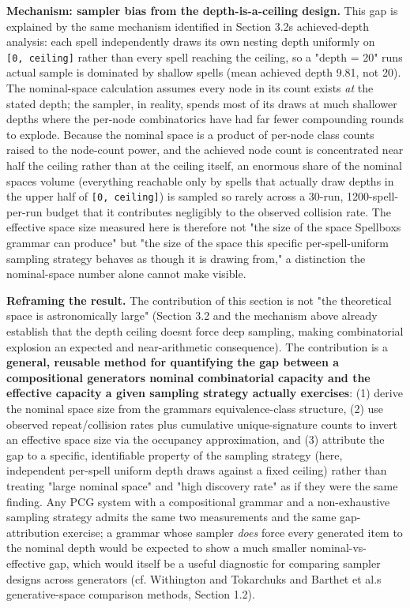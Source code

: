 \documentclass[
  10pt,
  twocolumn]{article}
\begin{document}
\textbf{Mechanism: sampler bias from the depth-is-a-ceiling design.}
This gap is explained by the same mechanism identified in Section
3.2\textquotesingle s achieved-depth analysis: each spell independently
draws its own nesting depth uniformly on \texttt{{[}0,\ ceiling{]}}
rather than every spell reaching the ceiling, so a "depth = 20"
run\textquotesingle s actual sample is dominated by shallow spells (mean
achieved depth 9.81, not 20). The nominal-space calculation assumes
every node in its count exists \emph{at} the stated depth; the sampler,
in reality, spends most of its draws at much shallower depths where the
per-node combinatorics have had far fewer compounding rounds to explode.
Because the nominal space is a product of per-node class counts raised
to the node-count power, and the achieved node count is concentrated
near half the ceiling rather than at the ceiling itself, an enormous
share of the nominal space\textquotesingle s volume (everything
reachable only by spells that actually draw depths in the upper half of
\texttt{{[}0,\ ceiling{]}}) is sampled so rarely across a 30-run,
1200-spell-per-run budget that it contributes negligibly to the observed
collision rate. The effective space size measured here is therefore not
"the size of the space Spellbox\textquotesingle s grammar can produce"
but "the size of the space this specific per-spell-uniform sampling
strategy behaves as though it is drawing from," a distinction the
nominal-space number alone cannot make visible.

\textbf{Reframing the result.} The contribution of this section is not
"the theoretical space is astronomically large" (Section 3.2 and the
mechanism above already establish that the depth ceiling
doesn\textquotesingle t force deep sampling, making combinatorial
explosion an expected and near-arithmetic consequence). The contribution
is a \textbf{general, reusable method for quantifying the gap between a
compositional generator\textquotesingle s nominal combinatorial capacity
and the effective capacity a given sampling strategy actually
exercises}: (1) derive the nominal space size from the
grammar\textquotesingle s equivalence-class structure, (2) use observed
repeat/collision rates plus cumulative unique-signature counts to invert
an effective space size via the occupancy approximation, and (3)
attribute the gap to a specific, identifiable property of the sampling
strategy (here, independent per-spell uniform depth draws against a
fixed ceiling) rather than treating "large nominal space" and "high
discovery rate" as if they were the same finding. Any PCG system with a
compositional grammar and a non-exhaustive sampling strategy admits the
same two measurements and the same gap-attribution exercise; a grammar
whose sampler \emph{does} force every generated item to the nominal
depth would be expected to show a much smaller nominal-vs-effective gap,
which would itself be a useful diagnostic for comparing sampler designs
across generators (cf. Withington and Tokarchuk\textquotesingle s and
Barthet et al.\textquotesingle s generative-space comparison methods,
Section 1.2).
\end{document}
